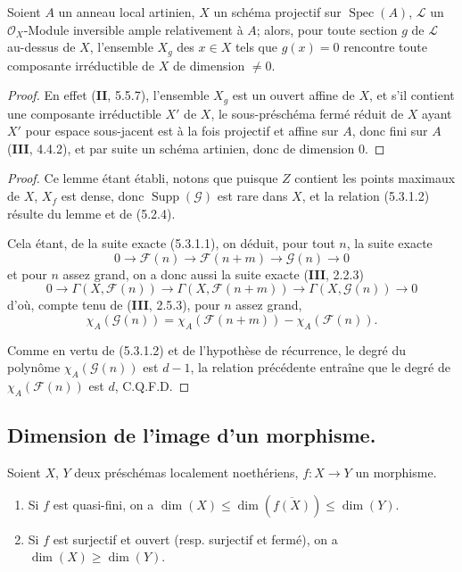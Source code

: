\begin{lemma}[5.3.1.3]
\label{IV.2.s5.3.1.3-fr}
Soient $A$ un anneau local artinien, $X$ un schéma projectif sur
$\operatorname{Spec}(A)$, $\mathcal L$ un $\mathcal O_X$-Module inversible
ample relativement à $A$; alors, pour toute section $g$ de $\mathcal L$
au-dessus de $X$, l'ensemble $X_g$ des $x\in X$ tels que $g(x)=0$ rencontre
toute composante irréductible de $X$ de dimension $\ne0$.
\end{lemma}

\begin{proof}
En effet (\textbf{II}, 5.5.7), l'ensemble $X_g$ est un ouvert affine de $X$, et s'il
contient une composante irréductible $X'$ de $X$, le sous-préschéma fermé
réduit de $X$ ayant $X'$ pour espace sous-jacent est à la fois projectif et
affine sur $A$, donc fini sur $A$ (\textbf{III}, 4.4.2), et par suite un schéma
artinien, donc de dimension $0$.
\end{proof}

\begin{proof}
Ce lemme étant établi, notons que puisque $Z$ contient les points maximaux de
$X$, $X_f$ est dense, donc $\operatorname{Supp}(\mathcal G)$ est rare dans
$X$, et la relation (5.3.1.2) résulte du lemme et de (5.2.4).


Cela étant, de la suite exacte (5.3.1.1), on déduit, pour tout $n$, la suite
exacte
\[
0\longrightarrow\mathcal F(n)\longrightarrow\mathcal F(n+m)
\longrightarrow\mathcal G(n)\longrightarrow0
\]
et pour $n$ assez grand, on a donc aussi la suite exacte (\textbf{III}, 2.2.3)
\[
0\longrightarrow\Gamma(X,\mathcal F(n))
\longrightarrow\Gamma(X,\mathcal F(n+m))
\longrightarrow\Gamma(X,\mathcal G(n))\longrightarrow0
\]
d'où, compte tenu de (\textbf{III}, 2.5.3), pour $n$ assez grand,
\[
\chi_A(\mathcal G(n))
=\chi_A(\mathcal F(n+m))-\chi_A(\mathcal F(n)).
\]

Comme en vertu de (5.3.1.2) et de l'hypothèse de récurrence, le degré du
polynôme $\chi_A(\mathcal G(n))$ est $d-1$, la relation précédente entraîne
que le degré de $\chi_A(\mathcal F(n))$ est $d$, C.Q.F.D.
\end{proof}

\subsection{Dimension de l'image d'un morphisme.}
\label{IV.2.s5.4-fr}

\begin{proposition}[5.4.1]
\label{IV.2.s5.4.1-fr}
Soient $X$, $Y$ deux préschémas localement noethériens, $f:X\to Y$ un
morphisme.
\begin{enumerate}
\item[\textup{(i)}] Si $f$ est quasi-fini, on a
$\dim(X)\leq\dim(\overline{f(X)})\leq\dim(Y)$.
\item[\textup{(ii)}] Si $f$ est surjectif et ouvert \textup{(resp.} surjectif et fermé\textup{)}, on a
$\dim(X)\geq\dim(Y)$.
\end{enumerate}
\end{proposition}

